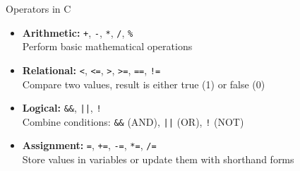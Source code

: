\documentclass[12pt, aspectratio=169]{beamer}
\begin{document}
    \begin{frame}{Operators in C}
        \begin{itemize}
            \item \textbf{Arithmetic:} \texttt{+}, \texttt{-}, \texttt{*}, \texttt{/}, \texttt{\%} \\
                Perform basic mathematical operations
            \item \textbf{Relational:} \texttt{<}, \texttt{<=}, \texttt{>}, \texttt{>=}, \texttt{==}, \texttt{!=} \\
                Compare two values, result is either true (1) or false (0)
            \item \textbf{Logical:} \texttt{\&\&}, \texttt{||}, \texttt{!} \\
                Combine conditions: \texttt{\&\&} (AND), \texttt{||} (OR), \texttt{!} (NOT)
            \item \textbf{Assignment:} \texttt{=}, \texttt{+=}, \texttt{-=}, \texttt{*=}, \texttt{/=} \\
                Store values in variables or update them with shorthand forms
        \end{itemize}
    \end{frame}
\end{document}
